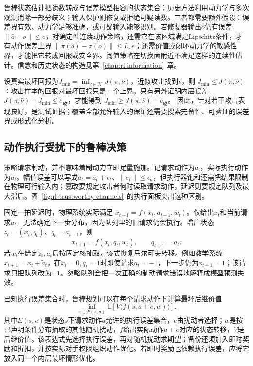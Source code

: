 鲁棒状态估计把读数转成与误差模型相容的状态集合；历史方法利用动力学与多次观测消除一部分歧义；输入保护则修复或拒绝可疑读数。三者都需要额外假设：误差界有效、动力学足够准确，或可疑输入能够识别。若修复器输出$\widehat o$仍有误差$\|\widehat o-o\|\leq e$，对确定性连续动作策略，还需它在该区域满足Lipschitz条件，才有动作误差上界
$\|\pi(\widehat o)-\pi(o)\|\leq L_\pi e$；还需价值或闭环动力学的敏感性界，才能把它转成回报或安全界。阈值策略在切换面附近不满足这样的连续性估计。信念和历史状态的构造见第~\ref{chap:rl-information}~章。

设真实最坏回报为$J_{\min}=\inf_{\nu\in\mathcal N}J(\pi,\nu)$，近似攻击找到$\widehat\nu$，则
$J_{\min}\leq J(\pi,\widehat\nu)$：攻击样本的回报对最坏回报只是一个上界。只有另外证明内层误差
$J(\pi,\widehat\nu)-J_{\min}\leq e_{\text{攻}}$，才能得到
$J_{\min}\geq J(\pi,\widehat\nu)-e_{\text{攻}}$。
因此，针对若干攻击表现良好，是测试证据；覆盖全部允许输入的保证还需要搜索完备性、可验证的误差界或形式化分析。

\subsection{动作执行受扰下的鲁棒决策}
\label{sec:rl-trustworthy-actuation}

策略请求制动，并不意味着制动力立即足量施加。记请求动作为$a_t$，实际执行动作为$\widetilde a_t$。幅值误差可以写成$\widetilde a_t=a_t+e_t$、$\|e_t\|\leq\epsilon_a$，但执行器饱和还需把结果限制在物理可行输入内；篡改要规定攻击者何时读取请求动作，延迟则要规定队列及最大滞后。图~\ref{fig:rl-trustworthy-channels}~的执行面板突出这种区别。

固定一拍延迟时，物理系统实际满足
$x_{t+1}=f(x_t,a_{t-1},w_t)$。仅给出$x_t$和当前请求$a_t$，无法确定下一步分布，因为队列里的旧请求仍会执行。增广状态
$z_t=(x_t,q_t)$、$q_t=a_{t-1}$，则
\begin{equation}
  x_{t+1}=f(x_t,q_t,w_t),\qquad q_{t+1}=a_t.
  \label{eq:rl-trustworthy-delay}
\end{equation}
若$w_t$在给定$z_t,a_t$后按固定核抽取，该式恢复马尔可夫转移。例如教学系统$x_{t+1}=x_t+\widetilde a_t$，在$x_t=0,q_t=1$时即使请求$a_t=-1$，下一步仍为$x_{t+1}=1$；该请求只把队列改为$-1$。忽略队列会把一次正确的制动请求错误地解释成模型预测失效。

已知执行误差集合时，鲁棒规划可以在每个请求动作下计算最坏后继价值
\begin{equation}
  \inf_{e\in E(s,a)}
       \mathbb E\!\left[V\bigl(f(s,a+e,w)\bigr)\right].
  \label{eq:rl-trustworthy-actuation-backup}
\end{equation}
其中$E(s,a)$是状态$s$下请求动作$a$允许的执行误差集合，$e$由扰动者选择；$w$是按已声明条件分布抽取的其他随机扰动，$f$给出实际动作$a+e$对应的状态转移，$V$是后继价值。该表达式先选择执行误差，再对随机扰动求期望；备份还须加入即时奖励和折扣，并按实际对手权限组织动作优化。若即时奖励也依赖执行误差，应将它放入同一个内层最坏情形优化。

